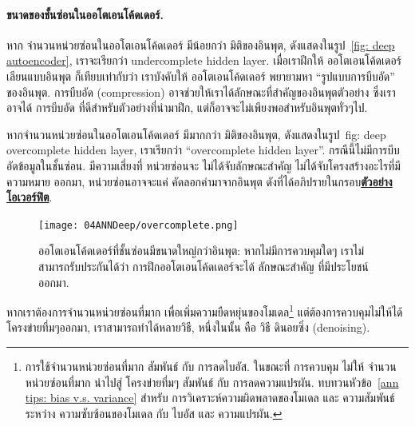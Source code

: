 \paragraph{ขนาดของชั้นซ่อนในออโตเอนโค้ดเดอร์.}
หาก จำนวนหน่วยซ่อนในออโตเอนโค้ดเดอร์ มีน้อยกว่า มิติของอินพุต, ดังแสดงในรูป~\ref{fig: deep autoencoder},
เราจะเรียกว่า undercomplete hidden layer.
เมื่อเราฝึกให้ ออโตเอนโค้ดเดอร์ เลียนแบบอินพุต ก็เทียบเท่ากับว่า เราบังคับให้ ออโตเอนโค้ดเดอร์ พยายามหา ``รูปแบบการบีบอัด'' ของอินพุต.
การบีบอัด (compression) อาจช่วยให้เราได้ลักษณะที่สำคัญของอินพุตตัวอย่าง
ซึ่งเราอาจได้ การบีบอัด ที่ดีสำหรับตัวอย่างที่นำมาฝึก, แต่ก็อาจจะไม่เพียงพอสำหรับอินพุตทั่วๆไป.


หากจำนวนหน่วยซ่อนในออโตเอนโค้ดเดอร์ มีมากกว่า มิติของอินพุต, ดังแสดงในรูป~{fig: deep overcomplete hidden layer},
เราเรียกว่า ``overcomplete hidden layer''.
กรณีนี้ไม่มีการบีบอัดข้อมูลในชั้นซ่อน.
มีความเสี่ยงที่ หน่วยซ่อนจะ ไม่ได้จับลักษณะสำคัญ ไม่ได้จับโครงสร้างอะไรที่มีความหมาย ออกมา, 
หน่วยซ่อนอาจจะแค่ คัดลอกค่ามาจากอินพุต ดังที่ได้อภิปรายในกรอบ\underline{\textbf{ตัวอย่าง โอเวอร์ฟิต}}.



%
\begin{figure}
\begin{center}
\texttt{[image: 04ANNDeep/overcomplete.png]}
\end{center}
\caption{ออโตเอนโค้ดเดอร์ที่ชั้นซ่อนมีขนาดใหญ่กว่าอินพุต: หากไม่มีการควบคุมใดๆ เราไม่สามารถรับประกันได้ว่า การฝึกออโตเอนโค้ดเดอร์จะได้ ลักษณะสำคัญ ที่มีประโยชน์ออกมา.}
\label{fig: deep overcomplete hidden layer}
\end{figure}
%

หากเราต้องการจำนวนหน่วยซ่อนที่มาก เพื่อเพิ่มความยืดหยุ่นของโมเดล\footnote{
การใช้จำนวนหน่วยซ่อนที่มาก สัมพันธ์ กับ การลดไบอัส.
ในขณะที่ การควบคุม ไม่ให้ จำนวนหน่วยซ่อนที่มาก นำไปสู่ โครงข่ายทึ่มๆ สัมพันธ์ กับ การลดความแปรผัน.
ทบทวนหัวข้อ~\ref{ann tips: bias v.s. variance} สำหรับ การวิเคราะห์ความผิดพลาดของโมเดล และ ความสัมพันธ์ระหว่าง ความซับซ้อนของโมเดล กับ ไบอัส และ ความแปรผัน.
} แต่ต้องการควบคุมไม่ให้ได้โครงข่ายทึ่มๆออกมา,
เราสามารถทำได้หลายวิธี, หนึ่งในนั้น คือ วิธี ดินอยซิ่ง (denoising).

